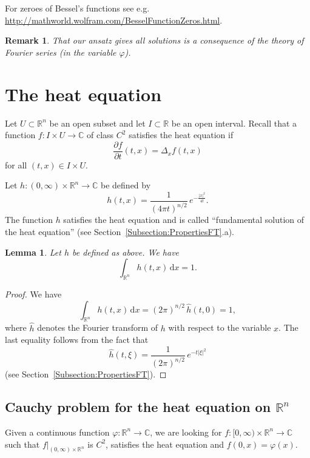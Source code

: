 \documentclass[12pt, oneside, a4paper]{article}
\newtheorem{lem}[thm]{Lemma}
\theoremstyle{dfn}
\newtheorem{rem}[thm]{Remark}
\def\Rbb{\ensuremath{\mathbb{R}}}
\def\dx{\,\mathrm dx}
\newcommand{\Com}{\mathbb{C}}
\providecommand{\abs}[1]{\lvert#1\rvert}
\begin{document}
For zeroes of Bessel's functions see e.g.\\ \url{http://mathworld.wolfram.com/BesselFunctionZeros.html}.

\begin{rem}
That our ansatz gives all solutions is a consequence of the theory of Fourier series (in the variable $\varphi$).
\end{rem}

\section{The heat equation}

Let $U \subset \Rbb^n$ be an open subset and let $I \subset \Rbb$ be an open interval. Recall that a function $f \colon I \times U \to \Com$ of class $C^2$ satisfies the heat equation if
\[
\frac{\partial f}{\partial t} (t,x) = \Delta_x f(t,x)
\]
for all $(t,x) \in I \times U$.

Let $h \colon (0,\infty) \times \Rbb^n \to \Com$ be defined by
\[
h(t,x) = \frac{1}{(4\pi t)^{n/2}} \, e^{-\frac{\abs{x}^2}{4t}}.
\]
The function $h$ satisfies the heat equation and is called ``fundamental solution of the heat equation'' (see Section~\ref{Subsection:PropertiesFT}.a).

\begin{lem}\label{Lemma:IntOfHIsOne}
Let $h$ be defined as above. We have
\[
\int_{\Rbb^n} h(t,x) \dx = 1.
\]
\end{lem}

\begin{proof}
We have
\[
\int_{\Rbb^n} h(t,x) \dx = (2\pi)^{n/2} \, \widehat{h}(t,0) = 1,
\]
where $\widehat{h}$ denotes the Fourier transform of $h$ with respect to the variable $x$. The last equality follows from the fact that
\[
\widehat{h}(t,\xi) = \frac{1}{(2\pi)^{n/2}} \, e^{-t\abs{\xi}^2}
\]
(see Section~\ref{Subsection:PropertiesFT}).
\end{proof}

\subsection{Cauchy problem for the heat equation on $\Rbb^n$}%

Given a continuous function $\varphi \colon \Rbb^n \to \Com$, we are looking for $f \colon [0,\infty) \times \Rbb^n \to \Com$ such that $f|_{(0,\infty) \times \Rbb^n}$ is $C^2$, satisfies the heat equation and $f(0,x) = \varphi(x)$.
\end{document}
